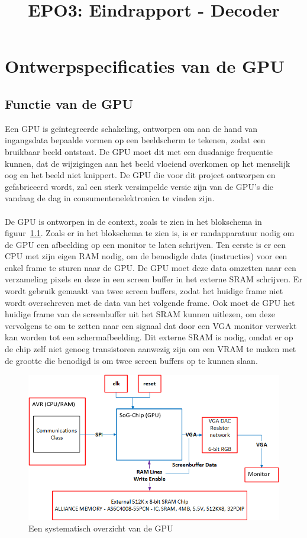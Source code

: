 \documentclass{scrartcl} %
\author{}
\title{EPO3: Eindrapport - Decoder}
\begin{document}
\chapter{Ontwerpspecificaties van de GPU}
\label{ch:spec}

\section {Functie van de GPU}
Een GPU is geïntegreerde schakeling, ontworpen om aan de hand van ingangsdata bepaalde vormen op een beeldscherm te tekenen, zodat een bruikbaar beeld ontstaat. De GPU moet dit met een dusdanige frequentie kunnen, dat de wijzigingen aan het beeld vloeiend overkomen op het menselijk oog en het beeld niet knippert. De GPU die voor dit project ontworpen en gefabriceerd wordt, zal een sterk versimpelde versie zijn van de GPU's die vandaag de dag in consumentenelektronica te vinden zijn.
\\\\
De GPU is ontworpen in de context, zoals te zien in het blokschema in figuur~\ref{fig:spec-overzicht}.
Zoals er in het blokschema te zien is, is er randapparatuur nodig om de GPU een afbeelding op een monitor te laten schrijven. Ten eerste is er een CPU met zijn eigen RAM nodig, om de benodigde data (instructies) voor een enkel frame te sturen naar de GPU. De GPU moet deze data omzetten naar een verzameling pixels en deze in een screen buffer in het externe SRAM schrijven. Er wordt gebruik gemaakt van twee screen buffers, zodat het huidige frame niet wordt overschreven met de data van het volgende frame. Ook moet de GPU het huidige frame van de screenbuffer uit het SRAM kunnen uitlezen, om deze vervolgens te om te zetten naar een signaal dat door een VGA monitor verwerkt kan worden tot een schermafbeelding. Dit externe SRAM is nodig, omdat er op de chip zelf niet genoeg transistoren aanwezig zijn om een VRAM te maken met de grootte die benodigd is om twee screen buffers op te kunnen slaan.

\begin{figure}[H]
\centering
	\includegraphics[scale=0.7]{Resource/system_overview.png}
	\caption{Een systematisch overzicht van de GPU}
	\label{fig:spec-overzicht}
\end{figure} 
\end{document}
